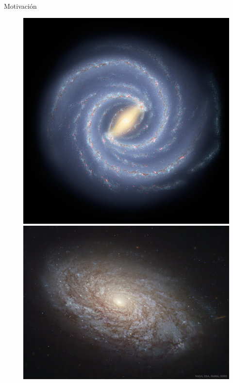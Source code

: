 \documentclass{beamer}
\begin{document}
\begin{frame}{Motivación}
\begin{figure}[h!]
\label{fig1}
     \begin{center}
     \includegraphics[scale=0.09]{multipleArms.jpg}
     \hspace{0.5cm}
     \includegraphics[scale=0.05]{floculenta.jpg}
     \hspace{0.5cm}

\end{center}
\end{figure}
\end{frame}
\end{document}

